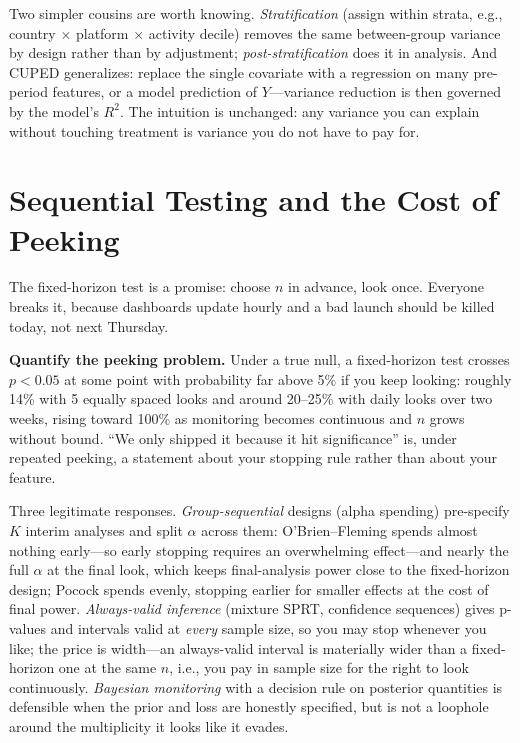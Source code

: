 Two simpler cousins are worth knowing. \emph{Stratification} (assign within strata, e.g., country $\times$ platform $\times$ activity decile) removes the same between-group variance by design rather than by adjustment; \emph{post-stratification} does it in analysis. And CUPED generalizes: replace the single covariate with a regression on many pre-period features, or a model prediction of $Y$---variance reduction is then governed by the model's $R^2$. The intuition is unchanged: any variance you can explain without touching treatment is variance you do not have to pay for.

\section{Sequential Testing and the Cost of Peeking}
\label{cml:sec:sequential}

The fixed-horizon test is a promise: choose $n$ in advance, look once. Everyone breaks it, because dashboards update hourly and a bad launch should be killed today, not next Thursday.

\begin{warningbox}
\textbf{Quantify the peeking problem.} Under a true null, a fixed-horizon test crosses $p < 0.05$ at some point with probability far above 5\% if you keep looking: roughly 14\% with 5 equally spaced looks and around 20--25\% with daily looks over two weeks, rising toward 100\% as monitoring becomes continuous and $n$ grows without bound. ``We only shipped it because it hit significance'' is, under repeated peeking, a statement about your stopping rule rather than about your feature.
\end{warningbox}

Three legitimate responses. \emph{Group-sequential} designs (alpha spending) pre-specify $K$ interim analyses and split $\alpha$ across them: O'Brien--Fleming spends almost nothing early---so early stopping requires an overwhelming effect---and nearly the full $\alpha$ at the final look, which keeps final-analysis power close to the fixed-horizon design; Pocock spends evenly, stopping earlier for smaller effects at the cost of final power. \emph{Always-valid inference} (mixture SPRT, confidence sequences) gives p-values and intervals valid at \emph{every} sample size, so you may stop whenever you like; the price is width---an always-valid interval is materially wider than a fixed-horizon one at the same $n$, i.e., you pay in sample size for the right to look continuously. \emph{Bayesian monitoring} with a decision rule on posterior quantities is defensible when the prior and loss are honestly specified, but is not a loophole around the multiplicity it looks like it evades.

